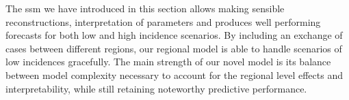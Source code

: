 The \acrshort{ssm} we have introduced in this section allows making sensible reconstructions, interpretation of parameters and produces well performing forecasts for both low and high incidence scenarios. By including an exchange of cases between different regions, our regional model is able to handle scenarios of low incidences gracefully. The main strength of our novel model is its balance between model complexity necessary to account for the regional level effects and interpretability, while still retaining noteworthy predictive performance. 

















